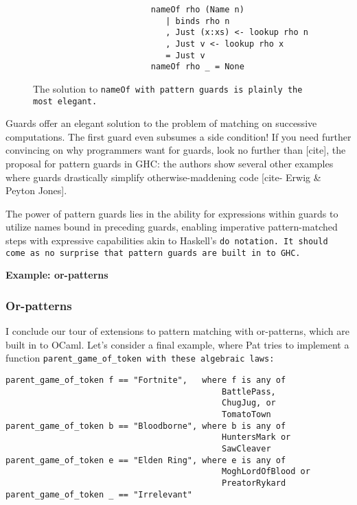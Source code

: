 \documentclass[manuscript,screen,review, 12pt]{acmart}
\begin{document}
\begin{outline}[enumerate]
    \begin{figure}[hbt!]  
        \begin{center}
        \begin{verbatim}
                        nameOf rho (Name n)
                           | binds rho n 
                           , Just (x:xs) <- lookup rho n
                           , Just v <- lookup rho x
                           = Just v
                        nameOf rho _ = None
        \end{verbatim}
        \end{center}    
    \caption{The solution to \tt{nameOf} with pattern guards is plainly the most
    elegant.} 
    \label{fig:guardnameof}
    \end{figure}

    Guards offer an elegant solution to the problem of matching on successive
    computations. The first guard even subsumes a side condition! If you need
    further convincing on why programmers want for guards, look no further than
    [cite], the proposal for pattern guards in GHC: the authors show several
    other examples where guards drastically simplify otherwise-maddening code
    [cite- Erwig \& Peyton Jones]. 
    
    The power of pattern guards lies in the ability for expressions within
    guards to utilize names bound in preceding guards, enabling imperative
    pattern-matched steps with expressive capabilities akin to Haskell's \tt{do}
    notation. It should come as no surprise that pattern guards are built in to
    GHC. 

        \2 \bf{Example: or-patterns}

\subsubsection{Or-patterns}

        I conclude our tour of extensions to pattern matching with or-patterns,
        which are built in to OCaml. Let's consider a final example, where Pat
        tries to implement a function \tt{parent\_game\_of\_token} with these 
        algebraic laws: 

        \begin{minipage}[t]{\textwidth}
            \centering 
            \begin{verbatim}
parent_game_of_token f == "Fortnite",   where f is any of 
                                            BattlePass, 
                                            ChugJug, or
                                            TomatoTown
parent_game_of_token b == "Bloodborne", where b is any of 
                                            HuntersMark or 
                                            SawCleaver
parent_game_of_token e == "Elden Ring", where e is any of 
                                            MoghLordOfBlood or  
                                            PreatorRykard 
parent_game_of_token _ == "Irrelevant"
                                        \end{verbatim}
        \end{minipage}
    


\end{outline}
\end{document}

